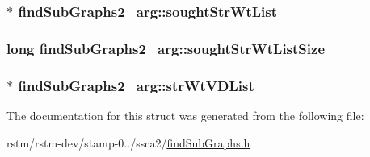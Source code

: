 \hypertarget{structfindSubGraphs2__arg_ab5b6e2a5ff9ab69ffe70d99da7877080}{
\subsubsection[{sought\-Str\-Wt\-List}]{$\ast$ find\-Sub\-Graphs2\-\_\-arg\-::sought\-Str\-Wt\-List}}\label{structfindSubGraphs2__arg_ab5b6e2a5ff9ab69ffe70d99da7877080}
\hypertarget{structfindSubGraphs2__arg_a8b7068c1955dd64970ff6234cce5363a}{
\subsubsection[{sought\-Str\-Wt\-List\-Size}]{\setlength{\rightskip}{0pt plus 5cm}long find\-Sub\-Graphs2\-\_\-arg\-::sought\-Str\-Wt\-List\-Size}}\label{structfindSubGraphs2__arg_a8b7068c1955dd64970ff6234cce5363a}
\hypertarget{structfindSubGraphs2__arg_a54e774d6935443c731276a1e5a8540eb}{
\subsubsection[{str\-Wt\-V\-D\-List}]{$\ast$ find\-Sub\-Graphs2\-\_\-arg\-::str\-Wt\-V\-D\-List}}\label{structfindSubGraphs2__arg_a54e774d6935443c731276a1e5a8540eb}


The documentation for this struct was generated from the following file\-:\begin{DoxyCompactItemize}
\item 
rstm/rstm-\/dev/stamp-\/0../ssca2/\hyperlink{findSubGraphs_8h}{find\-Sub\-Graphs.\-h}\end{DoxyCompactItemize}
